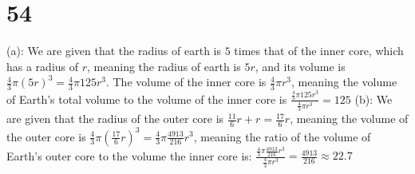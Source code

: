 \documentclass{article}
\theoremstyle{definition}
\begin{document}
\section*{54}
(a): We are given that the radius of earth is $5$ times that of the inner core, which has a radius of $r$, meaning the radius of earth is $5r$, 
and its volume is $\frac{4}{3}\pi (5r)^3=\frac{4}{3}\pi 125r^3$. The volume of the inner core is $\frac{4}{3}\pi r^3$, meaning the volume of Earth's total 
volume to the volume of the inner core is $\frac{\frac{4}{3}\pi 125r^3}{\frac{4}{3}\pi r^3}=125$\newline
(b): We are given that the radius of the outer core is $\frac{11}{6}r+r=\frac{17}{6}r$, meaning the volume of the outer core is $\frac{4}{3}\pi (\frac{17}{6}
r)^3=\frac{4}{3}\pi \frac{4913}{216}r^3$, meaning the ratio of the volume of Earth's outer core to the volume the inner core is:
$\frac{\frac{4}{3}\pi \frac{4913}{216}r^3}{\frac{4}{3}\pi r^3}=\frac{4913}{216}\approx 22.7$
\end{document}
